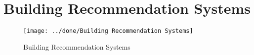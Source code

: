 \documentclass[a4paper,12pt]{article}
\begin{document}
\section*{Building Recommendation Systems}
\vspace{-5pt} %
\begin{figure}[h]
	\centering
	\vspace{-10pt} %
	\texttt{[image: ../done/Building Recommendation Systems]}
	\vspace{-5pt} %
	\caption{Building Recommendation Systems}
	\vspace{-10pt} %
\end{figure}
\end{document}
